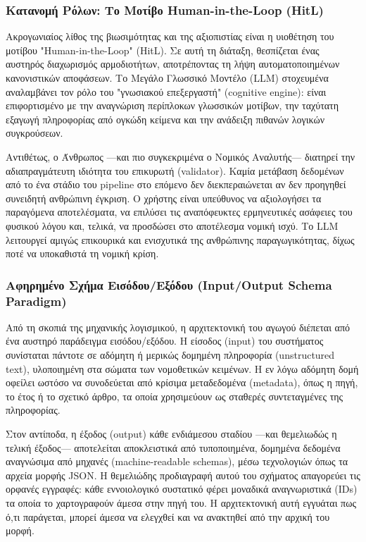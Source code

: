 \subsubsection{Κατανομή Ρόλων: Το Μοτίβο Human-in-the-Loop (HitL)}
Ακρογωνιαίος λίθος της βιωσιμότητας και της αξιοπιστίας είναι η υιοθέτηση του μοτίβου "Human-in-the-Loop" (HitL). Σε αυτή τη διάταξη, θεσπίζεται ένας αυστηρός διαχωρισμός αρμοδιοτήτων, αποτρέποντας τη λήψη αυτοματοποιημένων κανονιστικών αποφάσεων. Το Μεγάλο Γλωσσικό Μοντέλο (LLM) στοχευμένα αναλαμβάνει τον ρόλο του "γνωσιακού επεξεργαστή" (cognitive engine): είναι επιφορτισμένο με την αναγνώριση περίπλοκων γλωσσικών μοτίβων, την ταχύτατη εξαγωγή πληροφορίας από ογκώδη κείμενα και την ανάδειξη πιθανών λογικών συγκρούσεων.

Αντιθέτως, ο Άνθρωπος —και πιο συγκεκριμένα ο Νομικός Αναλυτής— διατηρεί την αδιαπραγμάτευτη ιδιότητα του επικυρωτή (validator). Καμία μετάβαση δεδομένων από το ένα στάδιο του pipeline στο επόμενο δεν διεκπεραιώνεται αν δεν προηγηθεί συνειδητή ανθρώπινη έγκριση. Ο χρήστης είναι υπεύθυνος να αξιολογήσει τα παραγόμενα αποτελέσματα, να επιλύσει τις αναπόφευκτες ερμηνευτικές ασάφειες του φυσικού λόγου και, τελικά, να προσδώσει στο αποτέλεσμα νομική ισχύ. Το LLM λειτουργεί αμιγώς επικουρικά και ενισχυτικά της ανθρώπινης παραγωγικότητας, δίχως ποτέ να υποκαθιστά τη νομική κρίση.

\subsubsection{Αφηρημένο Σχήμα Εισόδου/Εξόδου (Input/Output Schema Paradigm)}
Από τη σκοπιά της μηχανικής λογισμικού, η αρχιτεκτονική του αγωγού διέπεται από ένα αυστηρό παράδειγμα εισόδου/εξόδου. Η είσοδος (input) του συστήματος συνίσταται πάντοτε σε αδόμητη ή μερικώς δομημένη πληροφορία (unstructured text), υλοποιημένη στα σώματα των νομοθετικών κειμένων. Η εν λόγω αδόμητη δομή οφείλει ωστόσο να συνοδεύεται από κρίσιμα μεταδεδομένα (metadata), όπως η πηγή, το έτος ή το σχετικό άρθρο, τα οποία χρησιμεύουν ως σταθερές συντεταγμένες της πληροφορίας.

Στον αντίποδα, η έξοδος (output) κάθε ενδιάμεσου σταδίου —και θεμελιωδώς η τελική έξοδος— αποτελείται αποκλειστικά από τυποποιημένα, δομημένα δεδομένα αναγνώσιμα από μηχανές (machine-readable schemas), μέσω τεχνολογιών όπως τα αρχεία μορφής JSON. Η θεμελιώδης προδιαγραφή αυτού του σχήματος απαγορεύει τις ορφανές εγγραφές: κάθε εννοιολογικό συστατικό φέρει μοναδικά αναγνωριστικά (IDs) τα οποία το χαρτογραφούν άμεσα στην πηγή του. Η αρχιτεκτονική αυτή εγγυάται πως ό,τι παράγεται, μπορεί άμεσα να ελεγχθεί και να ανακτηθεί από την αρχική του μορφή.

